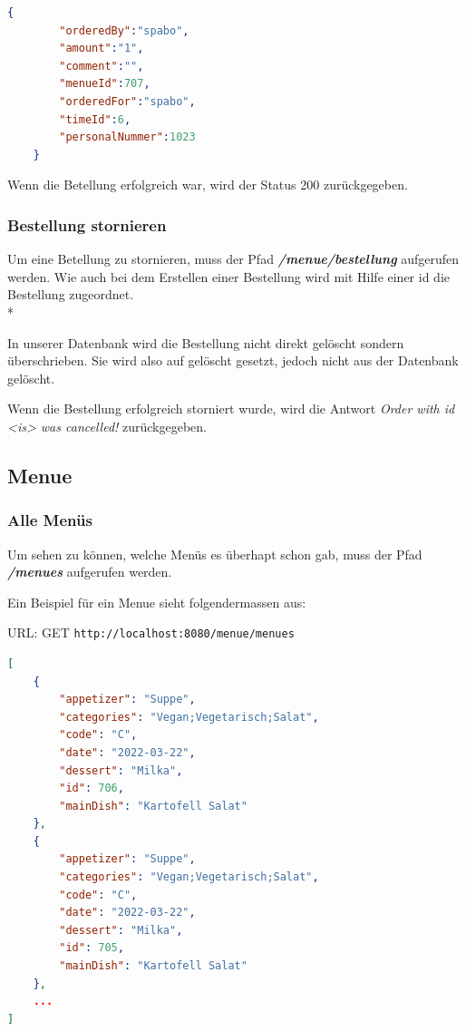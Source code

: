 \begin{lstlisting}[language=json,firstnumber=1]
    {
        "orderedBy":"spabo",
        "amount":"1",
        "comment":"",
        "menueId":707,
        "orderedFor":"spabo",
        "timeId":6,
        "personalNummer":1023
    }
\end{lstlisting}

Wenn die Betellung erfolgreich war, wird der Status 200 zurückgegeben.


\subsubsection{Bestellung stornieren}

Um eine Betellung zu stornieren, muss der Pfad \textbf{\textit{/menue/bestellung}} aufgerufen werden. Wie auch bei dem Erstellen einer Bestellung wird 
mit Hilfe einer id die Bestellung zugeordnet. \\*

In unserer Datenbank wird die Bestellung nicht direkt gelöscht sondern überschrieben. Sie wird also auf gelöscht gesetzt, jedoch nicht aus der Datenbank gelöscht.

Wenn die Bestellung erfolgreich storniert wurde, wird die Antwort \textit{Order with id <is> was cancelled!} zurückgegeben.

\subsection{Menue}

\subsubsection{Alle Menüs}

Um sehen zu können, welche Menüs es überhapt schon gab, muss der Pfad \textbf{\textit{/menues}} aufgerufen werden. 

Ein Beispiel für ein Menue sieht folgendermassen aus:

URL: GET \colorbox{white}{\lstinline[basicstyle=\ttfamily\color{black},language=html]|http://localhost:8080/menue/menues|}


\begin{lstlisting}[language=json,firstnumber=1]
[
    {
        "appetizer": "Suppe",
        "categories": "Vegan;Vegetarisch;Salat",
        "code": "C",
        "date": "2022-03-22",
        "dessert": "Milka",
        "id": 706,
        "mainDish": "Kartofell Salat"
    },
    {
        "appetizer": "Suppe",
        "categories": "Vegan;Vegetarisch;Salat",
        "code": "C",
        "date": "2022-03-22",
        "dessert": "Milka",
        "id": 705,
        "mainDish": "Kartofell Salat"
    },
    ...
]
\end{lstlisting}

